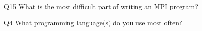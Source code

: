 \begin{description}%
\item{Q15} What is the most difficult part of writing an MPI program?%
\item{Q4} What programming language(s) do you use most often?%
\end{description}%

